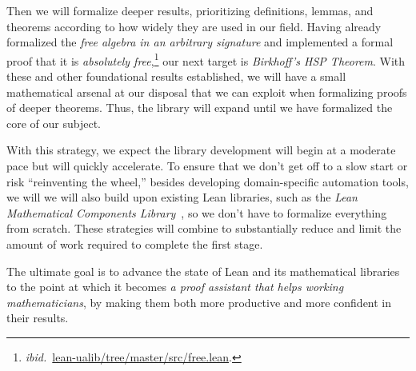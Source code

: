 \documentclass[11pt]{amsart}  %
\begin{document}
Then we will formalize deeper results, prioritizing definitions, lemmas, and theorems
according to how widely they are used in our field. Having already formalized the \emph{free algebra in an arbitrary signature} and implemented a formal proof that it is \emph{absolutely free},\footnote{{\it ibid.}~\href{https://github.com/UniversalAlgebra/lean-ualib/blob/master/src/free.lean}{lean-ualib/tree/master/src/free.lean}.} our next target is \emph{Birkhoff's HSP Theorem}. With these and other foundational results established, we will have a small mathematical arsenal 
at our disposal that we can exploit when formalizing proofs of deeper theorems. Thus, the library will expand until we have formalized the core of our subject.

With this strategy, we expect the library development will begin at a moderate pace but will quickly accelerate.  To ensure that we don't get off to a slow start or risk ``reinventing the wheel,'' besides developing domain-specific automation tools, we will we will also build upon existing Lean libraries, such as the \emph{Lean Mathematical Components Library}~\cite{lean-mathlib:2018}, so we don't have to formalize everything from scratch. These strategies will combine to substantially reduce and limit the amount of work required to complete the first stage.

The ultimate goal is to advance the state of Lean and its mathematical libraries to the point at which it becomes \emph{a proof assistant that helps working mathematicians}, by making them both
more productive and more confident in their results.


\end{document}
